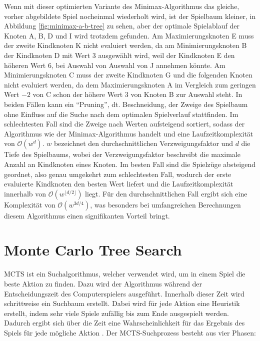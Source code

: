 Wenn mit dieser optimierten Variante des Minimax-Algorithmus das gleiche, vorher abgebildete Spiel nocheinmal wiederholt wird, ist der Spielbaum kleiner, in Abbildung \ref{fig:minimax-a-b-tree} zu sehen, aber der optimale Spielablauf der Knoten A, B, D und I wird trotzdem gefunden. Am Maximierungsknoten E muss der zweite Kindknoten K nicht evaluiert werden, da am Minimierungsknoten B der Kindknoten D mit Wert 3 ausgewählt wird, weil der Kindknoten E den höheren Wert 6, bei Auswahl von Auswahl von J annehmen könnte. Am Minimierungsknoten C muss der zweite Kindknoten G und die folgenden Knoten nicht evaluiert werden, da dem Maximierungsknoten A im Vergleich zum geringen Wert $-2$ von C schon der höhere Wert 3 von Knoten B zur Auswahl steht. In beiden Fällen kann ein \enquote{Pruning}, dt. Beschneidung, der Zweige des Spielbaum ohne Einfluss auf die Suche nach dem optimalen Spielverlauf stattfinden. Im schlechtesten Fall sind die Zweige nach Werten aufsteigend sortiert, sodass der Algorithmus wie der Minimax-Algorithmus handelt und eine Laufzeitkomplexität von $\mathcal{O}(w^{d})$. $w$ bezeichnet den durchschnittlichen Verzweigungsfaktor und $d$ die Tiefe des Spielbaums, wobei der Verzweigungsfaktor beschreibt die maximale Anzahl an Kindknoten eines Knoten. Im besten Fall sind die Spielzüge absteigend geordnet, also genau umgekehrt zum schlechtesten Fall, wodurch der erste evaluierte Kindknoten den besten Wert liefert und die Laufzeitkomplexität innerhalb von $\mathcal{O}\left(w^{\lfloor d/2\rfloor}\right)$ liegt. Für den durchschnittlichen Fall ergibt sich eine Komplexität von $\mathcal{O}\left(w^{3d/4}\right)$, was besonders bei umfangreichen Berechnungen diesem Algorithmus einen signifikanten Vorteil bringt. \cite[S. 3 ff.]{2017.AlphaBeta}

\section{Monte Carlo Tree Search}
\label{chapter:monte-carlo-tree-search}

\acf{MCTS} ist ein Suchalgorithmus, welcher verwendet wird, um in einem Spiel die beste Aktion zu finden. Dazu wird der Algorithmus während der Entscheidungszeit des Computerspielers ausgeführt. Innerhalb dieser Zeit wird schrittweise ein Suchbaum erstellt. Dabei wird für jede Aktion eine Heuristik erstellt, indem sehr viele Spiele zufällig bis zum Ende ausgespielt werden. Dadurch ergibt sich über die Zeit eine Wahrscheinlichkeit für das Ergebnis des Spiels für jede mögliche Aktion \cite[S. 61]{2008.ParallelMCTS}. Der \ac{MCTS}-Suchprozess besteht aus vier Phasen:

